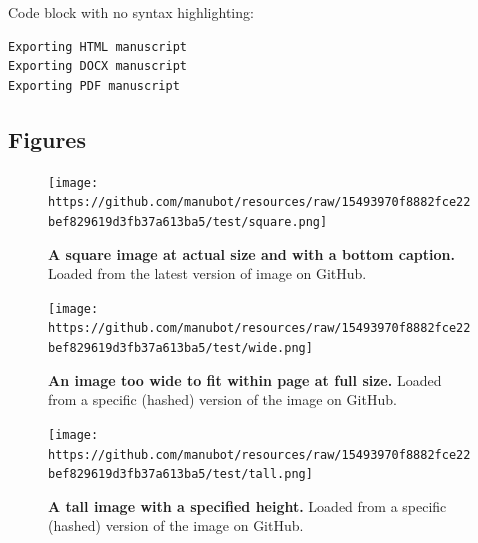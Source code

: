 \begin{Shaded}
\begin{Highlighting}[]

\OperatorTok{=}\NormalTok{)}
    \OperatorTok{==} 
\end{Highlighting}
\end{Shaded}

Code block with no syntax highlighting:

\begin{verbatim}
Exporting HTML manuscript
Exporting DOCX manuscript
Exporting PDF manuscript
\end{verbatim}

\hypertarget{figures}{%
\subsection{Figures}\label{figures}}

\begin{figure}
\hypertarget{fig:square-image}{%
\centering
\texttt{[image: https://github.com/manubot/resources/raw/15493970f8882fce22bef829619d3fb37a613ba5/test/square.png]}
\caption{\textbf{A square image at actual size and with a bottom caption.}
Loaded from the latest version of image on GitHub.}\label{fig:square-image}
}
\end{figure}

\begin{figure}
\hypertarget{fig:wide-image}{%
\centering
\texttt{[image: https://github.com/manubot/resources/raw/15493970f8882fce22bef829619d3fb37a613ba5/test/wide.png]}
\caption{\textbf{An image too wide to fit within page at full size.}
Loaded from a specific (hashed) version of the image on GitHub.}\label{fig:wide-image}
}
\end{figure}

\begin{figure}
\hypertarget{fig:tall-image}{%
\centering
\texttt{[image: https://github.com/manubot/resources/raw/15493970f8882fce22bef829619d3fb37a613ba5/test/tall.png]}
\caption{\textbf{A tall image with a specified height.}
Loaded from a specific (hashed) version of the image on GitHub.}\label{fig:tall-image}
}
\end{figure}

